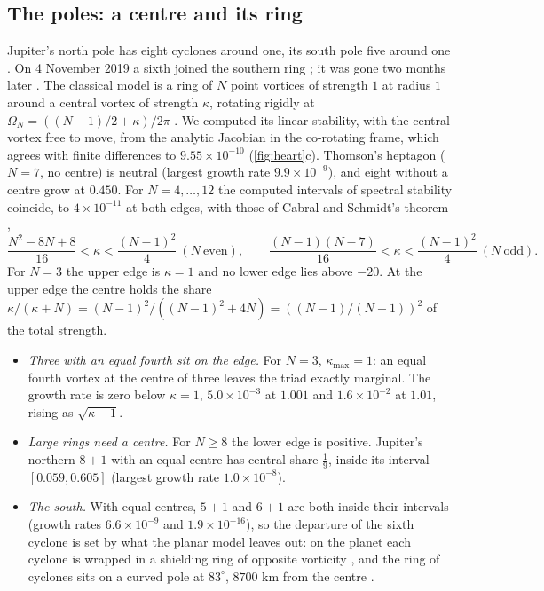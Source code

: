 \documentclass[11pt]{article}
\theoremstyle{definition}\newtheorem{definition}[theorem]{Definition}
\theoremstyle{remark}\newtheorem{remark}[theorem]{Remark}
\begin{document}
\subsection{The poles: a centre and its ring}\label{sec:poles}
Jupiter's north pole has eight cyclones around one, its south pole five around one \cite{Adriani}. On 4 November 2019 a sixth joined the southern ring \cite{PIA}; it was gone two months later \cite{Mura}. The classical model is a ring of $N$ point vortices of strength $1$ at radius $1$ around a central vortex of strength $\kappa$, rotating rigidly at $\Omega_N=((N-1)/2+\kappa)/2\pi$ \cite{Thomson}. We computed its linear stability, with the central vortex free to move, from the analytic Jacobian in the co-rotating frame, which agrees with finite differences to $9.55\times10^{-10}$ (\cref{fig:heart}c). Thomson's heptagon ($N=7$, no centre) is neutral (largest growth rate $9.9\times10^{-9}$), and eight without a centre grow at $0.450$. For $N=4,\dots,12$ the computed intervals of spectral stability coincide, to $4\times10^{-11}$ at both edges, with those of Cabral and Schmidt's theorem \cite{Cabral,BHW},
\[
\frac{N^2-8N+8}{16}<\kappa<\frac{(N-1)^2}4\ (N\ \text{even}),\qquad \frac{(N-1)(N-7)}{16}<\kappa<\frac{(N-1)^2}4\ (N\ \text{odd}).
\]
For $N=3$ the upper edge is $\kappa=1$ and no lower edge lies above $-20$. At the upper edge the centre holds the share $\kappa/(\kappa+N)=(N-1)^2/((N-1)^2+4N)=((N-1)/(N+1))^2$ of the total strength.
\begin{itemize}
\item \emph{Three with an equal fourth sit on the edge.} For $N=3$, $\kappa_{\max}=1$: an equal fourth vortex at the centre of three leaves the triad exactly marginal. The growth rate is zero below $\kappa=1$, $5.0\times10^{-3}$ at $1.001$ and $1.6\times10^{-2}$ at $1.01$, rising as $\sqrt{\kappa-1}$.
\item \emph{Large rings need a centre.} For $N\ge8$ the lower edge is positive. Jupiter's northern $8+1$ with an equal centre has central share $\frac19$, inside its interval $[0.059,0.605]$ (largest growth rate $1.0\times10^{-8}$).
\item \emph{The south.} With equal centres, $5+1$ and $6+1$ are both inside their intervals (growth rates $6.6\times10^{-9}$ and $1.9\times10^{-16}$), so the departure of the sixth cyclone is set by what the planar model leaves out: on the planet each cyclone is wrapped in a shielding ring of opposite vorticity \cite{Li}, and the ring of cyclones sits on a curved pole at $83^\circ$, $8700$ km from the centre \cite{Chen}.
\end{itemize}
\end{document}
